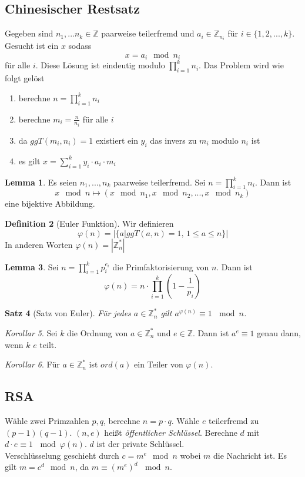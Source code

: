 \documentclass[a4paper, 12pt]{article}
\theoremstyle{plain}
\newtheorem{theorem}{Satz}[subsection] %
\theoremstyle{definition}
\newtheorem{definition}[theorem]{Definition} %
\theoremstyle{lemma}
\newtheorem{lemma}[theorem]{Lemma}
\theoremstyle{remark}
\theoremstyle{corollary}
\newtheorem{corollary}[theorem]{Korollar}
\theoremstyle{example}
\begin{document}
		\subsection{Chinesischer Restsatz}
	Gegeben sind $n_1,...n_k \in \mathbb{Z}$ paarweise teilerfremd und $a_i \in \mathbb{Z}_{n_i}$ für $i \in \{1,2,...,k\}$. Gesucht ist ein $x$ sodass \[x = a_i \mod n_i\] für alle $i$. Diese Lösung ist eindeutig modulo $\prod_{i=1}^{k} n_i$. Das Problem wird wie folgt gelöst \begin{enumerate}
		\item berechne $n = \prod_{i=1}^k n_i$
		\item berechne $m_i = \frac{n}{n_i}$ für alle $i$
		\item da $ggT(m_i,n_i) = 1$ existiert ein $y_i$ das invers zu $m_i$ modulo $n_i$ ist
		\item es gilt $x = \sum_{i=1}^k y_i\cdot a_i \cdot m_i$
	\end{enumerate}
	\begin{lemma}
		Es seien $n_1,...,n_k$ paarweise teilerfremd. Sei $n = \prod_{i=1}^k n_i$. Dann ist \[x \mod n \mapsto (x \mod n_1, x \mod n_2, ..., x\mod n_k)\] eine bijektive Abbildung.
	\end{lemma}
	\begin{definition}[Euler Funktion]
		Wir definieren \[\varphi(n) = \left|\{a | ggT(a,n) = 1, \, 1 \leq a \leq n\}\right|\] In anderen Worten $\varphi(n) = \left|\mathbb{Z}_n^*\right|$
	\end{definition}
	\begin{lemma}
		Sei $n = \prod_{i=1}^k p_i^{e_i}$ die Primfaktorisierung von $n$. Dann ist \[\varphi(n) = n \cdot \prod_{i=1}^k \left(1-\frac{1}{p_i}\right)\]
	\end{lemma}
	\begin{theorem}[Satz von Euler]
		Für jedes $a\in\mathbb{Z}_n^*$ gilt $a^{\varphi(n)}\equiv 1 \, \mod n$.
	\end{theorem}
	\begin{corollary}
		Sei $k$ die Ordnung von $a\in\mathbb{Z}_n^*$ und $e\in\mathbb{Z}$. Dann ist $a^e\equiv 1$ genau dann, wenn $k$ $e$ teilt.
	\end{corollary}
	\begin{corollary}
		Für $a\in\mathbb{Z}_n^*$ ist $ord(a)$ ein Teiler von $\varphi(n)$.
	\end{corollary}
	\subsection{RSA}
	Wähle zwei Primzahlen $p,q$, berechne $n=p\cdot q$. Wähle $e$ teilerfremd zu $(p-1)(q-1)$. $(n,e)$ heißt \textit{öffentlicher Schlüssel}. Berechne $d$ mit $d\cdot e \equiv 1 \, \mod \varphi(n)$. $d$ ist der private Schlüssel.\\
	Verschlüsselung geschieht durch $c = m^e \mod n$ wobei $m$ die Nachricht ist. Es gilt $m = c^d \mod n$, da $m\equiv (m^e)^d \, \mod n$.
\end{document}
